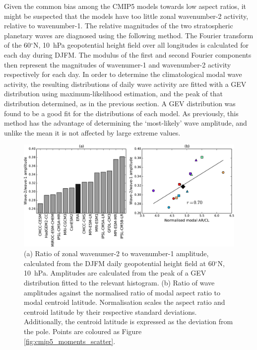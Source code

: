 Given the common bias among the CMIP5 models towards low aspect ratios, it might
be suspected that the models have too little zonal wavenumber-2 activity,
relative to wavenumber-1. The relative magnitudes of the two stratospheric
planetary waves are diagnosed using the following method. The Fourier transform
of the 60$^{\circ}$N, 10~hPa geopotential height field over all longitudes is
calculated for each day during DJFM. The modulus of the first and second Fourier
components then represent the magnitudes of wavenumer-1 and wavenumber-2
activity respectively for each day. In order to determine the climatological
modal wave activity, the resulting distributions of daily wave activity are
fitted with a GEV distribution using maximum-likelihood estimation, and the peak
of that distribution determined, as in the previous section. A GEV distribution
was found to be a good fit for the distributions of each model. As previously,
this method has the advantage of determining the `most-likely' wave amplitude,
and unlike the mean it is not affected by large extreme values. 

\begin{figure}
 \centering
 \noindent\includegraphics[width=\textwidth]{figures/chapter-models/CMIP5_waves_nolegend.pdf}
 \caption[CMIP5 wave diagnostics]{(a) Ratio of zonal wavenumer-2 to wavenumber-1
   amplitude, calculated from the DJFM daily geopotential height field at
   60$^{\circ}$N, 10~hPa. Amplitudes are calculated from the peak of a GEV
   distribution fitted to the relevant histogram. (b) Ratio of wave amplitudes
   against the normalised ratio of modal aspect ratio to modal centroid
   latitude. Normalisation scales the aspect ratio and centroid latitude by
   their respective standard deviations. Additionally, the centroid latitude is
   expressed as the deviation from the pole. Points are coloured as Figure
   \ref{fig:cmip5_moments_scatter}.}
 \label{fig:cmip5_waves}
\end{figure}

